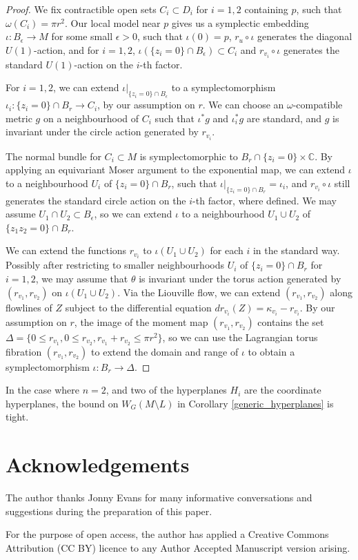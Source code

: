 \documentclass{article}
\numberwithin{equation}{section}
\numberwithin{figure}{section}
\begin{document}
\begin{proof}    
    We fix contractible open sets $C_i\subset D_i$ for $i=1,2$ containing $p$, such that $\omega(C_i)=\pi r^2$. Our local model near $p$ gives us a symplectic embedding $\iota:B_\epsilon\rightarrow M$ for some small $\epsilon>0$, such that $\iota(0)=p$, $r_{u}\circ \iota$ generates the diagonal $U(1)$-action, and for $i=1,2$, $\iota(\{z_i=0\}\cap B_\epsilon)\subset C_i$ and $r_{v_i}\circ \iota$ generates the standard $U(1)$-action on the $i$-th factor.

    For $i=1,2$, we can extend $\iota|_{\{z_i=0\}\cap B_\epsilon}$ to a symplectomorphism $\iota_i:\{z_i=0\}\cap B_r\rightarrow C_i$, by our assumption on $r$. We can choose an $\omega$-compatible metric $g$ on a neighbourhood of $C_i$ such that $\iota^*g$ and $\iota_i^*g$ are standard, and $g$ is invariant under the circle action generated by $r_{v_i}$. 
    
    The normal bundle for $C_i\subset M$ is symplectomorphic to $B_r\cap\{z_i=0\}\times \mathbb{C}$. By applying an equivariant Moser argument to the exponential map, we can extend $\iota$ to a neighbourhood $U_i$ of $\{z_i=0\}\cap B_r$, such that $\iota|_{\{z_i=0\}\cap B_r}=\iota_i$, and $r_{v_i}\circ\iota$ still generates the standard circle action on the $i$-th factor, where defined. We may assume $U_1\cap U_2\subset B_\epsilon$, so we can extend $\iota$ to a neighbourhood $U_1\cup U_2$ of $\{z_1z_2=0\}\cap B_r$.

    We can extend the functions $r_{v_i}$ to $\iota(U_1\cup U_2)$ for each $i$ in the standard way. Possibly after restricting to smaller neighbourhoods $U_i$ of $\{z_i=0\}\cap B_r$ for $i=1,2$, we may assume that $\theta$ is invariant under the torus action generated by $(r_{v_1},r_{v_2})$ on $\iota(U_1\cup U_2)$. Via the Liouville flow, we can extend $(r_{v_1},r_{v_2})$ along flowlines of $Z$ subject to the differential equation $dr_{v_i}(Z)=\kappa_{v_i}-r_{v_i}$. By our assumption on $r$, the image of the moment map $(r_{v_1},r_{v_2})$ contains the set $\Delta=\{0\leq r_{v_1},0\leq r_{v_2},r_{v_1}+r_{v_2}\leq \pi r^2\}$, so we can use the Lagrangian torus fibration $(r_{v_1},r_{v_2})$ to extend the domain and range of $\iota$ to obtain a symplectomorphism $\iota:B_r\rightarrow \Delta$.
\end{proof}

\begin{cor}
    In the case where $n=2$, and two of the hyperplanes $H_i$ are the coordinate hyperplanes, the bound on $W_G(M\setminus L)$ in Corollary \ref{generic_hyperplanes} is tight.
\end{cor}

\section*{Acknowledgements}
The author thanks Jonny Evans for many informative conversations and suggestions during the preparation of this paper.

For the purpose of open access, the author has applied a Creative Commons Attribution (CC BY) licence to any Author Accepted Manuscript version arising.
\printbibliography
\end{document}
